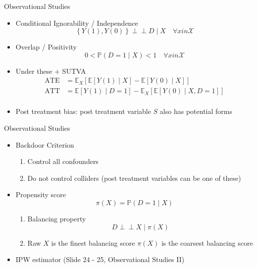 \documentclass[handout]{beamer}
\begin{document}
\begin{frame}{Observational Studies}
\begin{itemize}
    \item Conditional Ignorability / Independence
        $$
            \left\{ Y(1), Y(0) \right\} \perp\!\!\!\perp D \mid X \quad \forall x in \mathcal{X}
        $$ 
    \item Overlap / Positivity
        $$
            0 < \mathbb{P}\left( D = 1 \mid X \right) < 1 \quad \forall x in \mathcal{X}
        $$ 
    \item Under these + SUTVA
        $$
        \begin{aligned}
            \mathrm{ATE} &= \mathbb{E}_{X}\left[ \mathbb{E}\left[ Y(1) \mid X \right] - \mathbb{E}\left[ Y(0) \mid X \right]  \right] \\
            \mathrm{ATT} &= \mathbb{E}\left[ Y(1) \mid D = 1 \right] - \mathbb{E}_{X}\left[ \mathbb{E}\left[ Y(0) \mid X, D = 1 \right]  \right] \\
        \end{aligned}
        $$ 
    \item Post treatment bias: post treatment variable $S$ also has potential forms
\end{itemize}
\end{frame}

\begin{frame}{Observational Studies}
\begin{itemize}
    \item Backdoor Criterion
        \begin{enumerate}
            \item Control all confounders
            \item Do not control colliders (post treatment variables can be one of these)
        \end{enumerate}
    \item Propensity score
        $$
            \pi(X) = \mathbb{P}\left( D = 1 \mid X \right)
        $$ 
        \begin{enumerate}
            \item Balancing property
                $$
                    D \perp\!\!\!\perp X \mid \pi(X)
                $$ 
            \item Raw $X$ is the finest balancing score $\pi(X)$ is the coarsest balancing score
        \end{enumerate}
    \item IPW estimator (Slide 24 - 25, Observational Studies II)
\end{itemize}
\end{frame}
        
\end{document}
